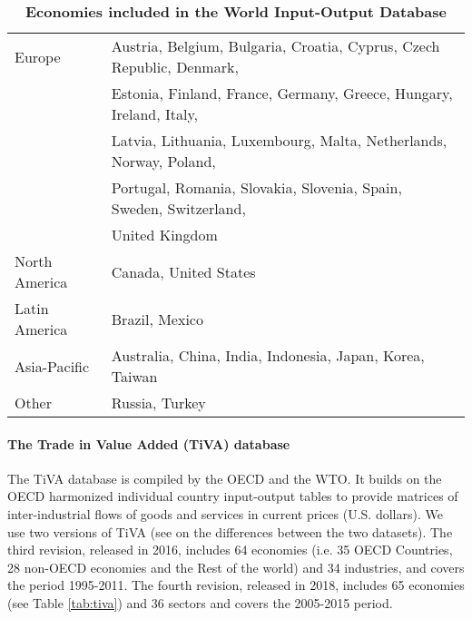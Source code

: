 \documentclass[11pt,a4paper]{article}
\begin{document}
 
\begin{table}[!h]
\begin{threeparttable}
\centering
\centering
\caption{\small{\textbf{Economies included in the World Input-Output Database}}}
\small
\begin{tabular}{ll}
\hline\hline
Europe & Austria, Belgium, Bulgaria, Croatia, Cyprus, Czech Republic, Denmark,\\
& Estonia, Finland, France, Germany, Greece, Hungary, Ireland, Italy,\\
& Latvia, Lithuania, Luxembourg, Malta, Netherlands, Norway, Poland,\\
&Portugal, Romania, Slovakia, Slovenia, Spain, Sweden, Switzerland,\\
& United Kingdom\\
North  America& Canada, United States\\
Latin America & Brazil, Mexico \\
Asia-Pacific & Australia, China, India, Indonesia, Japan, Korea, Taiwan\\
Other & Russia, Turkey\\
\hline\hline
\end{tabular} 
\label{tab:wiod}
\end{threeparttable}
\end{table} 
\paragraph{The Trade in Value Added (TiVA) database}
The TiVA database is compiled by the OECD and the WTO. It builds on the OECD harmonized individual country input-output tables to provide matrices of inter-industrial flows of goods and services in current prices (U.S. dollars).
We use two versions of TiVA (see \cite{OECD2018} on the differences between the two datasets).
The third revision, released in 2016, includes 64 economies (i.e. 35 OECD Countries, 28 non-OECD economies and the Rest of the world) and 34 industries, and covers the period 1995-2011.
The fourth revision, released in 2018, includes 65 economies (see Table \ref{tab:tiva}) and 36 sectors and covers the 2005-2015 period.
\end{document}
